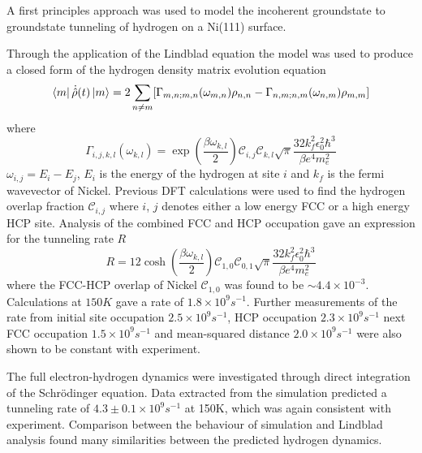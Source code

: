 A first principles
approach was used to
model the incoherent groundstate to
groundstate tunneling of
hydrogen on a Ni(111) surface. %

Through the application of the
Lindblad equation the model
was used to produce a closed form
of the hydrogen density
matrix evolution equation
\begin{equation}
    \bra{m}\dot{\hat{\rho}}(t) \ket{m}  =
    2 \sum_{n\neq m}
    [  \Gamma_{m,n;m, n}(\omega_{m,n})\rho_{n, n}
        - \Gamma_{n,m;n, m}(\omega_{n,m})\rho_{m, m}]
\end{equation}
where
\begin{equation}
    \Gamma_{i,j, k,l}(\omega_{k,l})   =
    \exp{(\frac{\beta \omega_{k,l}}{2})}
    \mathcal{C}_{i,j} \mathcal{C}_{k,l}
    \sqrt{\pi} \frac{32 k_f^2 \epsilon_0^2 \hbar^3}{\beta e^4 m_e^2}
\end{equation}
\(\omega_{i,j} = E_i - E_j\),
\(E_i\) is the energy of the hydrogen at
site \(i\) and \(k_f\) is the fermi wavevector
of Nickel. Previous DFT calculations
were used to find the hydrogen
overlap fraction
\(\mathcal{C}_{i,j}\) where
\(i\), \(j\) denotes either
a low energy FCC or a
high energy HCP site\cite{Jianding-Zhu}.
Analysis of the combined FCC and HCP
occupation gave an expression
for the tunneling rate \(R\)
\begin{equation}
    R   =
    12\cosh{(\frac{\beta \omega_{k,l}}{2})}
    \mathcal{C}_{1,0}\mathcal{C}_{0,1}
    \sqrt{\pi} \frac{32 k_f^2 \epsilon_0^2 \hbar^3}{\beta e^4 m_e^2}
\end{equation}
where the FCC-HCP
overlap of Nickel
\(\mathcal{C}_{1,0}\)
was found to be \(\sim 4.4\times{}10^{-3}\).
Calculations at
\(150K\) gave a rate of
\(1.8\times 10^9s^{-1}\).
Further measurements of the
rate from initial site
occupation \(2.5\times 10^{9}s^{-1}\), HCP occupation
\(2.3\times 10^{9}s^{-1}\)
next FCC occupation
\(1.5\times 10^{9}s^{-1}\)
and mean-squared distance
\(2.0\times{} 10^9s^{-1}\)
were also shown to be constant
with experiment.

The full electron-hydrogen
dynamics were investigated
through direct integration
of the Schrödinger equation.
Data extracted from the simulation
predicted a tunneling rate of
\(4.3\pm 0.1\times10^{9}s^{-1}\)
at 150K,
which was again
consistent with
experiment. Comparison
between the behaviour
of simulation
and Lindblad analysis
found many similarities
between the
predicted
hydrogen dynamics.